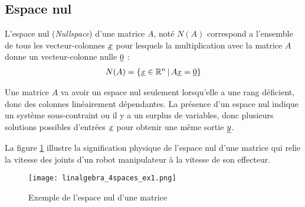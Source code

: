 \subsection{Espace nul}
\label{sec:nullspace}

L'espace nul (\textit{Nullspace}) d'une matrice $A$, noté $N(A)$ correspond a l'ensemble de tous les vecteur-colonnes $\underline{x}$ pour lesquels la multiplication avec la matrice $A$ donne un vecteur-colonne nulle $\underline{0}$ :
\begin{align}
N(A) = \left\{ \underline{x} \in \mathbb{R}^n \,|\, A\underline{x} = \underline{0} \right\}
\end{align}

Une matrice $A$ va avoir un espace nul seulement lorsqu'elle a une rang déficient, donc des colonnes linéairement dépendantes. La présence d'un espace nul indique un système sous-contraint ou il y a un surplus de variables, donc plusieurs solutions possibles d'entrées $\underline{x}$ pour obtenir une même sortie $\underline{y}$. 
%
%

\newpage
\begin{example}
La figure \ref{fig:4spaces_ex1} illustre la signification physique de l'espace nul d'une matrice qui relie la vitesse des joints d'un robot manipulateur à la vitesse de son effecteur.
\begin{figure}[H]
	\centering
		\texttt{[image: linalgebra\_4spaces\_ex1.png]}
	\caption{Exemple de l'espace nul d'une matrice}
	\label{fig:4spaces_ex1}
\end{figure}
\end{example}


